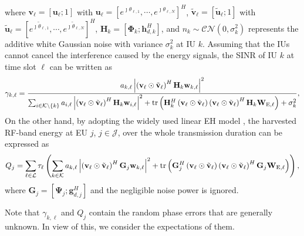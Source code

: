 \documentclass[12pt,draftclsnofoot, onecolumn]{IEEEtran}
\theoremstyle{plain}
\begin{document}
\begin{sloppypar}
\begin{align}
\end{align}
where $\mathbf v_\ell = \left[\mathbf u_\ell; 1\right]$ with $\mathbf u_\ell = \left[e^{\jmath\theta_{\ell,1}},\cdots, e^{\jmath\theta_{\ell,N}}\right]^H$,  $\tilde {\mathbf v}_\ell = \left[\tilde {\mathbf u}_\ell; 1\right]$ with $\tilde {\mathbf u}_\ell = \left[e^{\jmath\tilde {\theta}_{\ell,1}},\cdots, e^{\jmath\tilde {\theta}_{\ell,N}}\right]^H$, $\mathbf H_k = \left[\mathbf \Phi_k;\mathbf h_{d,k}^H\right]$, and $n_k \sim\mathcal {CN} \left(0, \sigma_k^2 \right)$ represents the additive white Gaussian noise with variance $\sigma_k^2$ at IU $k$. Assuming that the IUs cannot cancel the interference caused by the energy signals, the SINR of IU $k$ at time slot $\ell$ can be written as
\begin{align}\label{equ:SINR}
\gamma_{k,\ell} = \frac{a_{k,\ell}\left|\left( \mathbf v_\ell\odot\tilde {\mathbf v}_\ell\right)^H\mathbf H_k\mathbf w_{k,\ell}\right|^2}{\sum_{i\in \mathcal K\backslash\{k\}}a_{i,\ell}\left|\left( \mathbf v_\ell\odot\tilde {\mathbf v}_\ell\right)^H\mathbf H_k\mathbf w_{i,\ell}\right|^2 + {\rm tr}\left(\mathbf H_k^H\left( \mathbf v_\ell\odot\tilde {\mathbf v}_\ell\right)\left( \mathbf v_\ell\odot\tilde {\mathbf v}_\ell\right)^H\mathbf H_k\mathbf W_{\mathrm E,\ell}\right) + \sigma_k^2}, 
\end{align} 
On the other hand, by adopting the widely used linear EH model \cite{2020_Qingqing_SWIPT_letter,2020_Qingqing_SWIPT_QoS,2020_Cunhua_SWIPT}, the harvested RF-band energy at EU $j$, $j\in\mathcal J$, over the whole transmission duration can be expressed as 
\begin{align}\label{equ:E}
Q_j = \sum_{\ell\in\mathcal L}\tau_\ell\left(\sum_{k\in\mathcal K}a_{k,\ell}\left|\left( \mathbf v_\ell\odot\tilde {\mathbf v}_\ell\right)^H\mathbf G_j\mathbf w_{k,\ell} \right|^2 + {\rm tr}\left(\mathbf G_j^H\left( \mathbf v_\ell\odot\tilde {\mathbf v}_\ell\right)\left( \mathbf v_\ell\odot\tilde {\mathbf v}_\ell\right)^H\mathbf G_j\mathbf W_{\mathrm E, \ell} \right) \right), 
\end{align}
where $\mathbf G_j = \left[\mathbf \Psi_j;\mathbf g_{d,j}^H\right]$ and the negligible noise power is ignored.

Note that $\gamma_{k,\ell}$ and $Q_j$ contain the random phase errors that are generally unknown. In view of this, we consider the expectations of them.  


\end{sloppypar}
\end{document}
